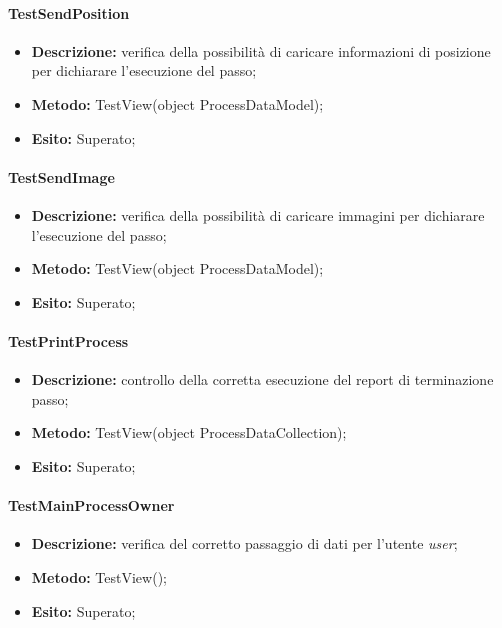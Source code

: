 \paragraph{TestSendPosition}
\begin{itemize}
\item \textbf{Descrizione:} verifica della possibilità di caricare informazioni di posizione per dichiarare l'esecuzione del passo;
\item \textbf{Metodo:} TestView(object ProcessDataModel);
\item \textbf{Esito:} Superato;
\end{itemize}

\paragraph{TestSendImage}
\begin{itemize}
\item \textbf{Descrizione:} verifica della possibilità di caricare immagini per dichiarare l'esecuzione del passo;
\item \textbf{Metodo:} TestView(object ProcessDataModel);
\item \textbf{Esito:} Superato;
\end{itemize}

\paragraph{TestPrintProcess}
\begin{itemize}
\item \textbf{Descrizione:} controllo della corretta esecuzione del report di terminazione passo;
\item \textbf{Metodo:} TestView(object ProcessDataCollection);
\item \textbf{Esito:} Superato;
\end{itemize}

\paragraph{TestMainProcessOwner}
\begin{itemize}
\item \textbf{Descrizione:} verifica del corretto passaggio di dati per l'utente \textit{user};
\item \textbf{Metodo:} TestView();
\item \textbf{Esito:} Superato;
\end{itemize}

